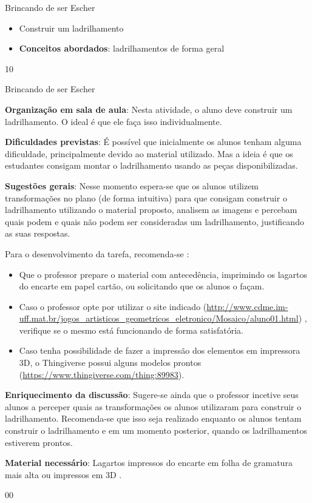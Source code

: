 \clearmargin
\begin{objectives}{Brincando de ser Escher}
{
	\begin{itemize}
		\item Construir um ladrilhamento
		\item \textbf{Conceitos abordados}: ladrilhamentos de forma geral
	\end{itemize}	
}{1}{0}
\end{objectives}
\begin{sugestions}{Brincando de ser Escher}
{
	\textbf{Organização em sala de aula}: Nesta atividade, o aluno deve construir um ladrilhamento. O ideal é que ele faça isso individualmente. 

	\textbf{Dificuldades previstas}: É possível que inicialmente os alunos tenham alguma dificuldade, principalmente devido ao material utilizado. Mas a ideia é que os estudantes consigam montar o ladrilhamento usando as peças disponibilizadas.

	\textbf{Sugestões gerais}: Nesse momento espera-se que os alunos utilizem transformações no plano (de forma intuitiva) para que consigam construir o ladrilhamento utilizando o material proposto, analisem as imagens e percebam quais podem e quais não podem ser consideradas um ladrilhamento, justificando as suas respostas.

	Para o desenvolvimento da tarefa, recomenda-se : 
	\begin{itemize}
	\item Que o professor prepare o material com antecedência, imprimindo os lagartos do encarte em papel cartão, ou solicitando que os alunos o façam. 
	\item Caso o professor opte por utilizar o site indicado (\url{http://www.cdme.im-uff.mat.br/jogos_artisticos_geometricos_eletronico/Mosaico/aluno01.html}) , verifique se o mesmo está funcionando de forma satisfatória. 
	\item Caso tenha possibilidade de fazer a impressão dos elementos em impressora 3D, o Thingiverse possui alguns modelos prontos (\url{https://www.thingiverse.com/thing:89983}).
	\end{itemize}
 
	\textbf{Enriquecimento da discussão}: Sugere-se ainda que o professor incetive seus alunos a perceper quais as transformações os alunos utilizaram para construir o ladrilhamento. Recomenda-se que isso seja realizado enquanto os alunos tentam construir o ladrilhamento e em um momento posterior, quando os ladrilhamentos estiverem prontos.

	\textbf{Material necessário}: Lagartos impressos do encarte em folha de gramatura mais alta ou impressos em 3D .
}{0}{0}
\end{sugestions}
